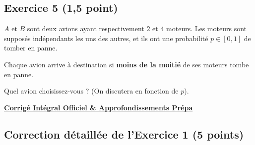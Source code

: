 \documentclass[11pt,a4paper]{article}
\begin{document}
\subsection*{Exercice 5 \hfill (1,5 point)}

$A$ et $B$ sont deux avions ayant respectivement $2$ et $4$ moteurs. Les moteurs sont supposés indépendants les uns des autres, et ils ont une probabilité $p \in [0, 1]$ de tomber en panne.

Chaque avion arrive à destination si \textbf{moins de la moitié} de ses moteurs tombe en panne.

Quel avion choisissez-vous ? (On discutera en fonction de $p$).

\newpage

\begin{center}
    {\Large \bfseries \color{emeraldtitle} \underline{Corrigé Intégral Officiel \& Approfondissements Prépa}}
\end{center}

\vspace{0.3cm}

\subsection*{Correction détaillée de l'Exercice 1 \hfill (5 points)}
\end{document}

